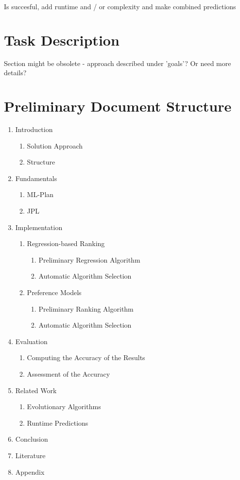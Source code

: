 \documentclass[12pt]{scrartcl}
\begin{document}
Is succesful, add runtime and / or complexity and make combined predictions

\section{Task Description}\label{sec:task-description}
Section might be obsolete - approach described under 'goals'? Or need more details?
\newpage

\section{Preliminary Document Structure}\label{sec:doc-structure}
\begin{enumerate}
	\item Introduction
	\begin{enumerate}[1.1]
		\item Solution Approach
		\item Structure
	\end{enumerate}
	\item Fundamentals
	\begin{enumerate}[2.1]
		\item ML-Plan
		\item JPL
	\end{enumerate}
	\item Implementation
	\begin{enumerate} [3.1]
		\item Regression-based Ranking
		\begin{enumerate}[3.1.1]
			\item Preliminary Regression Algorithm
			\item Automatic Algorithm Selection
		\end{enumerate}
		\item Preference Models
		\begin{enumerate}
			\item Preliminary Ranking Algorithm
			\item Automatic Algorithm Selection
		\end{enumerate}
	\end{enumerate}
	\item Evaluation
	\begin{enumerate}[4.1]
		\item Computing the Accuracy of the Results
		\item Assessment of the Accuracy
	\end{enumerate}
	\item Related Work
	\begin{enumerate}[5.1]
		\item Evolutionary Algorithms
		\item Runtime Predictions
	\end{enumerate}
	\item Conclusion
	\item Literature
	\item Appendix
\end{enumerate}
\end{document}
